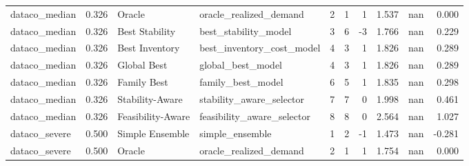\begin{table}
{\begin{tabular}{lrllrrrrrr}
 dataco\_median &             0.326 &             Oracle &      oracle\_realized\_demand &                              2 &                                       1 &                        1 &                  1.537 &               nan &                  0.000 \\
 dataco\_median &             0.326 &     Best Stability &        best\_stability\_model &                              3 &                                       6 &                       -3 &                  1.766 &               nan &                  0.229 \\
 dataco\_median &             0.326 &     Best Inventory &   best\_inventory\_cost\_model &                              4 &                                       3 &                        1 &                  1.826 &               nan &                  0.289 \\
 dataco\_median &             0.326 &        Global Best &           global\_best\_model &                              4 &                                       3 &                        1 &                  1.826 &               nan &                  0.289 \\
 dataco\_median &             0.326 &        Family Best &           family\_best\_model &                              6 &                                       5 &                        1 &                  1.835 &               nan &                  0.298 \\
 dataco\_median &             0.326 &    Stability-Aware &    stability\_aware\_selector &                              7 &                                       7 &                        0 &                  1.998 &               nan &                  0.461 \\
 dataco\_median &             0.326 &  Feasibility-Aware &  feasibility\_aware\_selector &                              8 &                                       8 &                        0 &                  2.564 &               nan &                  1.027 \\
 dataco\_severe &             0.500 &    Simple Ensemble &             simple\_ensemble &                              1 &                                       2 &                       -1 &                  1.473 &               nan &                 -0.281 \\
 dataco\_severe &             0.500 &             Oracle &      oracle\_realized\_demand &                              2 &                                       1 &                        1 &                  1.754 &               nan &                  0.000 \\

\end{tabular}}
\end{table}
